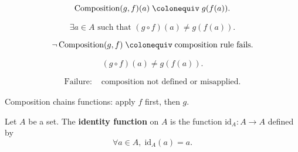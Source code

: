 \begin{remark*}
\[
\operatorname{Composition}(g,f)(a)
\;\colonequiv\;
g(f(a)).
\]
\end{remark*}

\begin{remark*}
\[
\exists a \in A \text{ such that }
(g \circ f)(a) \ne g(f(a)).
\]
\end{remark*}

\begin{remark*}
\[
\neg \operatorname{Composition}(g,f)
\;\colonequiv\;
\text{composition rule fails}.
\]
\end{remark*}

\begin{remark*}
\[
(g \circ f)(a) \ne g(f(a)).
\]
\end{remark*}

\begin{remark*}
\[
\begin{aligned}
\text{Failure: } 
&\text{composition not defined or misapplied}.
\end{aligned}
\]
\end{remark*}

\begin{remark*}[Interpretation]
Composition chains functions: apply $f$ first, then $g$.
\end{remark*}













\begin{tcolorbox}[title={Definition --- Identity Function}]
\begin{definition}
\label{def:alg-identity}
Let $A$ be a set. The \textbf{identity function} on $A$ is the function
$\mathrm{id}_A : A \to A$ defined by
\[
\forall a \in A,\; \mathrm{id}_A(a) = a.
\]
\end{definition}
\end{tcolorbox}


